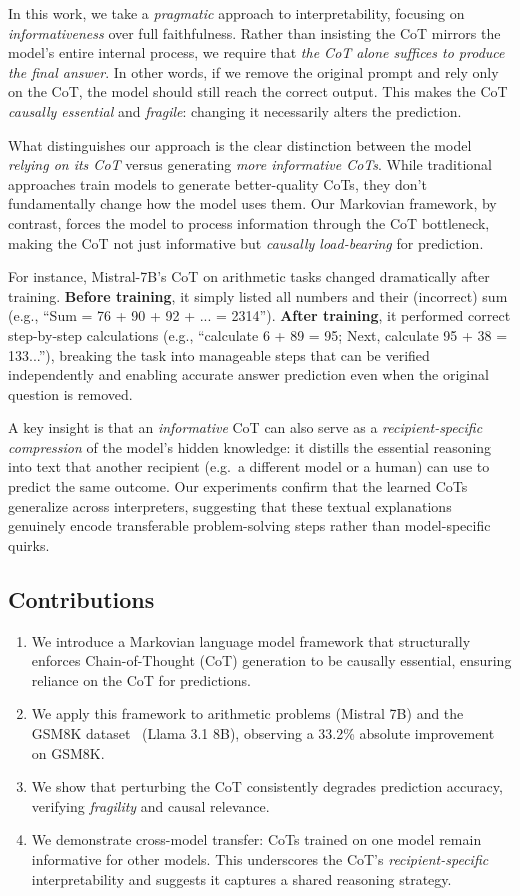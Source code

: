 \documentclass[letterpaper]{article} %
\begin{document}
In this work, we take a \emph{pragmatic} approach to interpretability, focusing on \emph{informativeness} over full faithfulness. Rather than insisting the CoT mirrors the model's entire internal process, we require that \emph{the CoT alone suffices to produce the final answer}. In other words, if we remove the original prompt and rely only on the CoT, the model should still reach the correct output. This makes the CoT \emph{causally essential} and \emph{fragile}: changing it necessarily alters the prediction.

What distinguishes our approach is the clear distinction between the model \emph{relying on its CoT} versus generating \emph{more informative CoTs}. While traditional approaches train models to generate better-quality CoTs, they don't fundamentally change how the model uses them. Our Markovian framework, by contrast, forces the model to process information through the CoT bottleneck, making the CoT not just informative but \emph{causally load-bearing} for prediction.

For instance, Mistral-7B's CoT on arithmetic tasks changed dramatically after training. \textbf{Before training}, it simply listed all numbers and their (incorrect) sum (e.g., ``Sum = 76 + 90 + 92 + ... = 2314''). \textbf{After training}, it performed correct step-by-step calculations (e.g., ``calculate 6 + 89 = 95; Next, calculate 95 + 38 = 133...''), breaking the task into manageable steps that can be verified independently and enabling accurate answer prediction even when the original question is removed.

A key insight is that an \emph{informative} CoT can also serve as a \emph{recipient-specific compression} of the model's hidden knowledge: it distills the essential reasoning into text that another recipient (e.g.\ a different model or a human) can use to predict the same outcome. Our experiments confirm that the learned CoTs generalize across interpreters, suggesting that these textual explanations genuinely encode transferable problem-solving steps rather than model-specific quirks.

\subsection{Contributions}
\begin{enumerate}
    \item We introduce a Markovian language model framework that structurally enforces Chain-of-Thought (CoT) generation to be causally essential, ensuring reliance on the CoT for predictions.
    \item We apply this framework to arithmetic problems (Mistral 7B) and the GSM8K dataset~\citep{cobbe2021gsm8k} (Llama 3.1 8B), observing a 33.2\% absolute improvement on GSM8K.
    \item We show that perturbing the CoT consistently degrades prediction accuracy, verifying \emph{fragility} and causal relevance.
    \item We demonstrate cross-model transfer: CoTs trained on one model remain informative for other models. This underscores the CoT's \emph{recipient-specific} interpretability and suggests it captures a shared reasoning strategy.
\end{enumerate}
\end{document}
